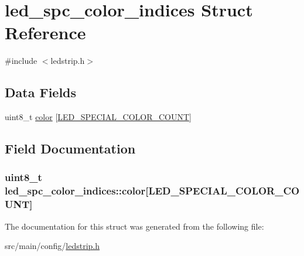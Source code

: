 \hypertarget{structled__spc__color__indices}{\section{led\+\_\+spc\+\_\+color\+\_\+indices Struct Reference}
\label{structled__spc__color__indices}
}


{\ttfamily \#include $<$ledstrip.\+h$>$}

\subsection*{Data Fields}
\begin{DoxyCompactItemize}
\item 
uint8\+\_\+t \hyperlink{structled__spc__color__indices_ab0ac72d545a0c707e8ce08232f6db0b1}{color} \mbox{[}\hyperlink{config_2ledstrip_8h_acf2ceddfc923060f2f67258134d4be61}{L\+E\+D\+\_\+\+S\+P\+E\+C\+I\+A\+L\+\_\+\+C\+O\+L\+O\+R\+\_\+\+C\+O\+U\+N\+T}\mbox{]}
\end{DoxyCompactItemize}


\subsection{Field Documentation}
\hypertarget{structled__spc__color__indices_ab0ac72d545a0c707e8ce08232f6db0b1}{
\subsubsection[{color}]{\setlength{\rightskip}{0pt plus 5cm}uint8\+\_\+t led\+\_\+spc\+\_\+color\+\_\+indices\+::color\mbox{[}{\bf L\+E\+D\+\_\+\+S\+P\+E\+C\+I\+A\+L\+\_\+\+C\+O\+L\+O\+R\+\_\+\+C\+O\+U\+N\+T}\mbox{]}}}\label{structled__spc__color__indices_ab0ac72d545a0c707e8ce08232f6db0b1}


The documentation for this struct was generated from the following file\+:\begin{DoxyCompactItemize}
\item 
src/main/config/\hyperlink{config_2ledstrip_8h}{ledstrip.\+h}\end{DoxyCompactItemize}
